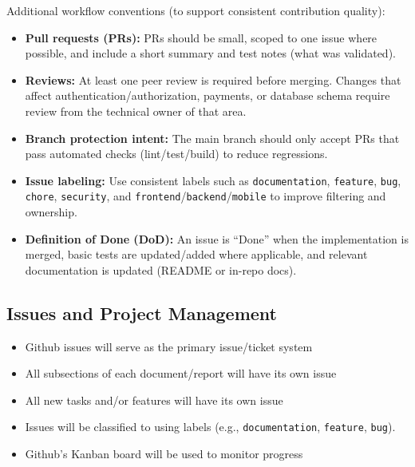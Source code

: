 \documentclass{article}
\begin{document}
\noindent Additional workflow conventions (to support consistent contribution quality):
\begin{itemize}
    \item \textbf{Pull requests (PRs):} PRs should be small, scoped to one issue where possible, and include a short summary and test notes (what was validated).
    \item \textbf{Reviews:} At least one peer review is required before merging. Changes that affect authentication/authorization, payments, or database schema require review from the technical owner of that area.
    \item \textbf{Branch protection intent:} The main branch should only accept PRs that pass automated checks (lint/test/build) to reduce regressions.
    \item \textbf{Issue labeling:} Use consistent labels such as \texttt{documentation}, \texttt{feature}, \texttt{bug}, \texttt{chore}, \texttt{security}, and \texttt{frontend}/\texttt{backend}/\texttt{mobile} to improve filtering and ownership.
    \item \textbf{Definition of Done (DoD):} An issue is ``Done'' when the implementation is merged, basic tests are updated/added where applicable, and relevant documentation is updated (README or in-repo docs).
\end{itemize}

\subsection{Issues and Project Management}
\begin{itemize}
    \item Github issues will serve as the primary issue/ticket system
    \item All subsections of each document/report will have its own issue
    \item All new tasks and/or features will have its own issue
    \item Issues will be classified to using labels (e.g., \texttt{documentation}, \texttt{feature}, \texttt{bug}).
    \item Github's Kanban board will be used to monitor progress
\end{itemize}
\end{document}
